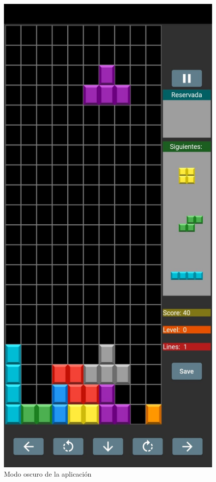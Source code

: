 \documentclass{article}
\begin{document}
\begin{figure}[H]
\center
        \includegraphics[scale=0.4]{imagenes/captura2dark.jpeg}
        \caption{Modo oscuro de la aplicación}
\end{figure}
\end{document}
